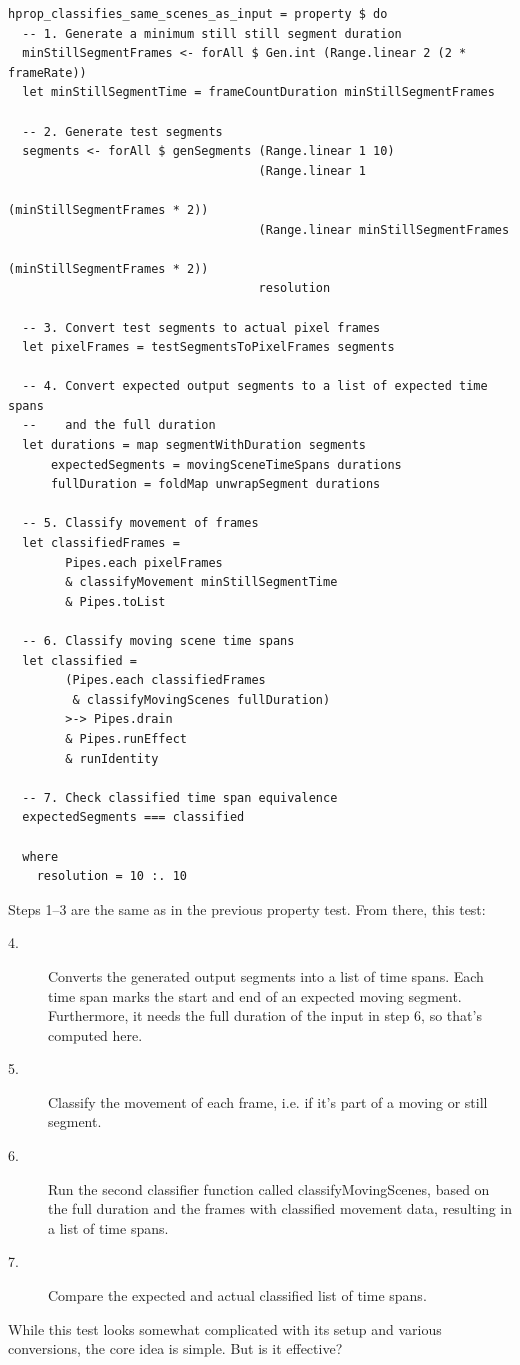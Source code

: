 \begin{verbatim}
hprop_classifies_same_scenes_as_input = property $ do
  -- 1. Generate a minimum still still segment duration
  minStillSegmentFrames <- forAll $ Gen.int (Range.linear 2 (2 * frameRate))
  let minStillSegmentTime = frameCountDuration minStillSegmentFrames

  -- 2. Generate test segments
  segments <- forAll $ genSegments (Range.linear 1 10)
                                   (Range.linear 1
                                                 (minStillSegmentFrames * 2))
                                   (Range.linear minStillSegmentFrames
                                                 (minStillSegmentFrames * 2))
                                   resolution

  -- 3. Convert test segments to actual pixel frames
  let pixelFrames = testSegmentsToPixelFrames segments

  -- 4. Convert expected output segments to a list of expected time spans
  --    and the full duration
  let durations = map segmentWithDuration segments
      expectedSegments = movingSceneTimeSpans durations
      fullDuration = foldMap unwrapSegment durations

  -- 5. Classify movement of frames
  let classifiedFrames =
        Pipes.each pixelFrames
        & classifyMovement minStillSegmentTime
        & Pipes.toList

  -- 6. Classify moving scene time spans
  let classified =
        (Pipes.each classifiedFrames
         & classifyMovingScenes fullDuration)
        >-> Pipes.drain
        & Pipes.runEffect
        & runIdentity

  -- 7. Check classified time span equivalence
  expectedSegments === classified

  where
    resolution = 10 :. 10
\end{verbatim}
Steps 1--3 are the same as in the previous property test. From there, this test:

\begin{description}
\item [4.] Converts the generated output segments into a list of time spans. Each time span marks the start and end of an expected moving segment. Furthermore, it needs the full duration of the input in step 6, so that's computed here.
\item [5.] Classify the movement of each frame, i.e. if it's part of a moving or still segment.
\item [6.]Run the second classifier function called classifyMovingScenes, based on the full duration and the frames with classified movement data, resulting in a list of time spans.
\item [7.] Compare the expected and actual classified list of time spans.
\end{description}
While this test looks somewhat complicated with its setup and various conversions, the core idea is simple. But is it effective?



